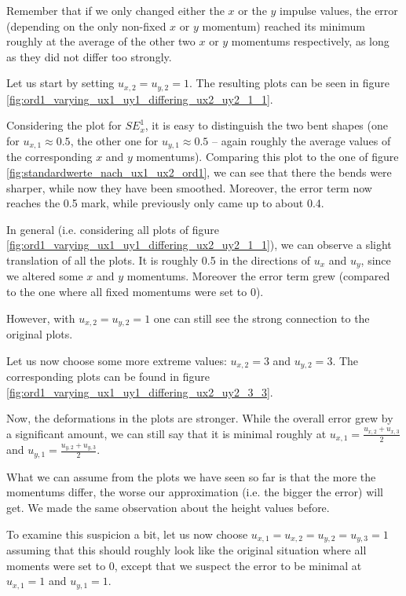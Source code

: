 \documentclass{article}
\begin{document}
Remember that if we only changed either the $x$ or the $y$ impulse values, the error (depending on the only non-fixed $x$ or $y$ momentum) reached its minimum roughly at the average of the other two $x$ or $y$ momentums respectively, as long as they did not differ too strongly.

Let us start by setting $u_{x,2}=u_{y,2}=1$. The resulting plots can be seen in figure \ref{fig:ord1_varying_ux1_uy1_differing_ux2_uy2_1_1}.

Considering the plot for $SE_x^1$, it is easy to distinguish the two bent shapes (one for $u_{x,1}\approx 0.5$, the other one for $u_{y,1}\approx 0.5$ -- again roughly the average values of the corresponding $x$ and $y$ momentums). Comparing this plot to the one of figure \ref{fig:standardwerte_nach_ux1_ux2_ord1}, we can see that there the bends were sharper, while now they have been smoothed. Moreover, the error term now reaches the 0.5 mark, while previously only came up to about 0.4.

In general (i.e. considering all plots of figure \ref{fig:ord1_varying_ux1_uy1_differing_ux2_uy2_1_1}), we can observe a slight translation of all the plots. It is roughly 0.5 in the directions of $u_x$ and $u_y$, since we altered some $x$ and $y$ momentums. Moreover the error term grew (compared to the one where all fixed momentums were set to 0).

However, with $u_{x,2}=u_{y,2}=1$ one can still see the strong connection to the original plots.

Let us now choose some more extreme values: $u_{x,2}=3$ and $u_{y,2}=3$. The corresponding plots can be found in figure \ref{fig:ord1_varying_ux1_uy1_differing_ux2_uy2_3_3}.



Now, the deformations in the plots are stronger. While the overall error grew by a significant amount, we can still say that it is minimal roughly at $u_{x,1}=\frac{u_{x,2}+u_{x,3}}{2}$ and $u_{y,1}=\frac{u_{y,2}+u_{y,3}}{2}$.

What we can assume from the plots we have seen so far is that the more the momentums differ, the worse our approximation (i.e. the bigger the error) will get. We made the same observation about the height values before.

To examine this suspicion a bit, let us now choose $u_{x,1}=u_{x,2}=u_{y,2}=u_{y,3}=1$ assuming that this should roughly look like the original situation where all moments were set to 0, except that we suspect the error to be minimal at $u_{x,1}=1$ and $u_{y,1}=1$.
\end{document}
